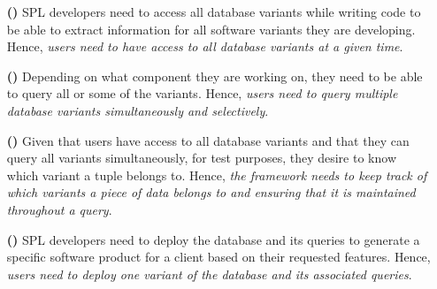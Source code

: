 \begin{enumerate}
\item [\textbf{(\nZero)}]
SPL developers need to access all database variants while
writing code to be able to extract information for all software variants
they are developing. 
%
Hence,
\emph{users need to have access to all database variants at a given time}.
%
%
\item [\textbf{(\nOne)}]
Depending on what component they are working on,
they need to be able to query all or some of the variants.
%
Hence, 
\emph{users need to query multiple database variants simultaneously and selectively}.
%
%
\item [\textbf{(\nTwo)}]
Given that users have access to all database variants and that they
can query all variants simultaneously, for test purposes, 
they desire to know which variant a tuple belongs to.
%
Hence,
\emph{the framework needs to 
keep track of which variants a piece of data belongs to and ensuring that 
it is maintained throughout a query}.
%
%
\item [\textbf{(\nThree)}]
SPL developers need to deploy the database and its queries
to generate a specific software product for a client based on their
requested features. 
%
Hence,
\emph{users need to deploy one variant of the database and its associated queries}.
%
%
\end{enumerate}


